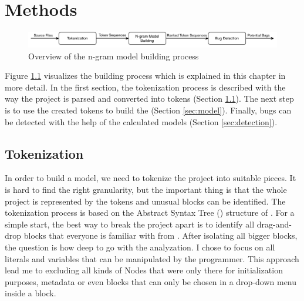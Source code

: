 \chapter{Methods}\label{chap:methods}

\begin{figure}[hbtp]
\centering
\includegraphics[scale=0.75]{images/Overview.pdf}
\caption{Overview of the n-gram model building process}
\label{fig:overview}
\end{figure}

Figure \ref{fig:overview} visualizes the \ngram{} building process which is explained in this chapter in more detail. In the first section, the tokenization process is described with the way the \scratch{} project is parsed and converted into tokens (Section \ref{sec:tokenization}). The next step is to use the created tokens to build the  (Section \ref{sec:model}). Finally, bugs can be detected with the help of the calculated models (Section \ref{sec:detection}).


\section{Tokenization}\label{sec:tokenization}
In order to build a model, we need to tokenize the \scratch{} project into suitable pieces. It is hard to find the right granularity, but the important thing is that the whole project is represented by the tokens and unusual blocks can be identified. The tokenization process is based on the Abstract Syntax Tree (\AST{}) structure of \litterbox{}. For a simple start, the best way to break the project apart is to identify all drag-and-drop blocks that everyone is familiar with from \scratch{}. After isolating all bigger blocks, the question is how deep to go with the analyzation. I chose to focus on all literals and variables that can be manipulated by the \scratch{} programmer. This approach lead me to excluding all kinds of \AST{}Nodes that were only there for initialization purposes, metadata or even blocks that can only be chosen in a drop-down menu inside a block.  


